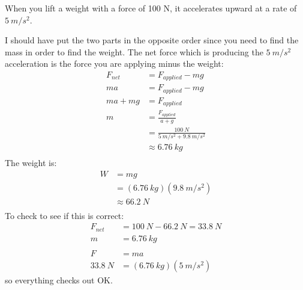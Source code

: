 \documentclass[fleqn,addpoints]{exam}
\begin{document}
\begin{questions}
\begin{solution}
\end{solution}

\question
When you lift a weight with a force of 100 N, it accelerates upward at a rate of $5 \ m/s^2$.

\begin{solution}
I should have put the two parts in the opposite order since you need to find the mass in order to find the weight.  The
net force which is producing the $5 \ m/s^2$ acceleration is the force you are applying minus the weight:
\begin{align*}
  F_{net} &= F_{applied} - mg \\
  ma &= F_{applied} - mg \\
  ma + mg &= F_{applied} \\
  m &= \frac{F_{applied}}{a + g} \\
   &= \frac{100 \ N}{5 \ m/s^2 + 9.8 \ m/s^2} \\
   &\approx 6.76 \ kg \\
\end{align*}
The weight is:
\begin{align*}
  W &= mg \\
    &= (6.76 \ kg)(9.8 \ m/s^2) \\
    &\approx 66.2 \ N \\
\end{align*}
To check to see if this is correct:
\begin{align*}
  F_{net} &= 100 \ N - 66.2 \ N = 33.8 \ N \\
  m &= 6.76 \ kg \\
  \\
  F &= ma \\
  33.8 \ N &= (6.76 \ kg)(5 \ m/s^2)
\end{align*}
so everything checks out OK.

\end{solution}

\end{questions}
\end{document}
